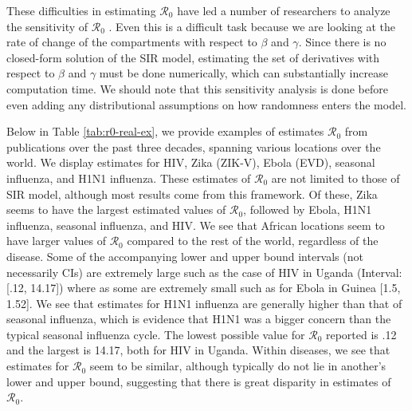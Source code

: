 \documentclass[12pt]{article}
\newcommand{\rr}{\ensuremath{\mathcal{R}_0}}
\begin{document}
These difficulties in estimating $\rr$ have led a number of researchers to analyze the sensitivity of $\rr$ \citep{lash2003,epstein2007agent,capaldi2012}.  Even this is a difficult task because we are looking at the rate of change of the compartments with respect to $\beta$ and $\gamma$.  Since there is no closed-form solution of the SIR model, estimating the set of derivatives with respect to $\beta$ and $\gamma$ must be done numerically, which can substantially increase computation time.  We should note that this sensitivity analysis is done before even adding any distributional assumptions on how randomness enters the model.

Below in Table \ref{tab:r0-real-ex}, we provide examples of estimates $\rr$ from publications over the past three decades, spanning various locations over the world.  We display estimates for HIV, Zika (ZIK-V), Ebola (EVD), seasonal influenza, and H1N1 influenza.  These estimates of $\rr$ are not limited to those of SIR model, although most results come from this framework.  Of these, Zika seems to have the largest estimated values of $\rr$, followed by Ebola, H1N1 influenza, seasonal influenza, and HIV.  We see that African locations seem to have larger values of $\rr$ compared to the rest of the world, regardless of the disease.  Some of the accompanying lower and upper bound intervals (not necessarily CIs) are extremely large such as the case of HIV in Uganda (Interval: [.12, 14.17]) where as some are extremely small such as for Ebola in Guinea [1.5, 1.52].  We see that estimates for H1N1 influenza are generally higher than that of seasonal influenza, which is evidence that H1N1 was a bigger concern than the typical seasonal influenza cycle.  The lowest possible value for $\rr$ reported is .12 and the largest is 14.17, both for HIV in Uganda.  Within diseases, we see that estimates for $\rr$ seem to be similar, although typically do not lie in another's lower and upper bound, suggesting that there is great disparity in estimates of $\rr$.
\end{document}
